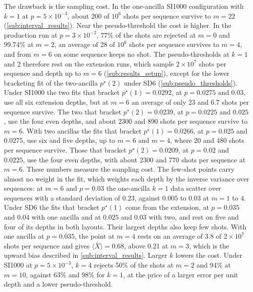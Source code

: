 The drawback is the sampling cost. In the one-ancilla SI1000 configuration with $k = 1$ at $p = 5\times10^{-3}$, about 200 of $10^6$ shots per sequence survive to $m = 22$ (\autoref{sub:interval_results}). Near the pseudo-threshold the cost is higher. In the production run at $p = 3\times10^{-2}$, 77\% of the shots are rejected at $m = 0$ and 99.74\% at $m = 2$, an average of 28 of $10^6$ shots per sequence survives to $m = 4$, and from $m = 6$ on some sequence keeps no shot. The pseudo-thresholds at $k = 1$ and $2$ therefore rest on the extension runs, which sample $2\times10^7$ shots per sequence and depth up to $m = 6$ (\autoref{sub:results_setup}), except for the lower bracketing fit of the two-ancilla $p^\star(2)$ under SD6 (\autoref{sub:pseudo_thresholds}).
Under SI1000 the two fits that bracket $p^\star(1) = 0.0292$, at $p = 0.0275$ and $0.03$, use all six extension depths, but at $m = 6$ an average of only 23 and 6.7 shots per sequence survive. The two that bracket $p^\star(2) = 0.0239$, at $p = 0.0225$ and $0.025$, use the four even depths, and about 2300 and 890 shots per sequence survive to $m = 6$. With two ancillas the fits that bracket $p^\star(1) = 0.0266$, at $p = 0.025$ and $0.0275$, use six and five depths, up to $m = 6$ and $m = 4$, where 20 and 480 shots per sequence survive. Those that bracket $p^\star(2) = 0.0209$, at $p = 0.02$ and $0.0225$, use the four even depths, with about 2300 and 770 shots per sequence at $m = 6$. These numbers measure the sampling cost. The few-shot points carry almost no weight in the fit, which weights each depth by the inverse variance over sequences: at $m = 6$ and $p = 0.03$ the one-ancilla $k = 1$ data scatter over sequences with a standard deviation of $0.23$, against $0.005$ to $0.03$ at $m = 1$ to $4$.
Under SD6 the fits that bracket $p^\star(1)$ come from the extension, at $p = 0.035$ and $0.04$ with one ancilla and at $0.025$ and $0.03$ with two, and rest on five and four of its depths in both layouts. Their largest depths also keep few shots. With one ancilla at $p = 0.035$, the point at $m = 4$ rests on an average of 3.8 of $2\times10^7$ shots per sequence and gives $\langle \bar{X} \rangle = 0.68$, above $0.21$ at $m = 3$, which is the upward bias described in \autoref{sub:interval_results}. Larger $k$ lowers the cost. Under SI1000 at $p = 5\times10^{-3}$, $k = 4$ rejects 50\% of the shots at $m = 2$ and 94\% at $m = 10$, against 63\% and 98\% for $k = 1$, at the price of a larger error per unit depth and a lower pseudo-threshold.

